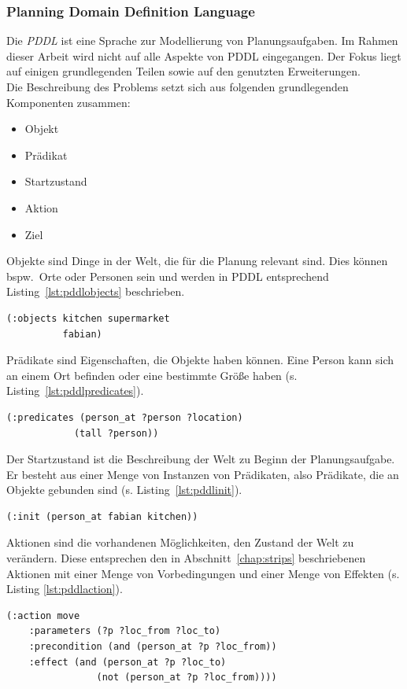 \subsubsection{Planning Domain Definition Language}{\label{sec:pddl}}
Die \emph{\ac{PDDL}} ist eine Sprache zur Modellierung von Planungsaufgaben.
Im Rahmen dieser Arbeit wird nicht auf alle Aspekte von \ac{PDDL} eingegangen.
Der Fokus liegt auf einigen grundlegenden Teilen sowie auf den genutzten Erweiterungen.\\
Die Beschreibung des Problems setzt sich aus folgenden grundlegenden Komponenten zusammen:
\begin{itemize}
    \item Objekt
    \item Prädikat
    \item Startzustand
    \item Aktion
    \item Ziel
\end{itemize}
Objekte sind Dinge in der Welt, die für die Planung relevant sind.
Dies können bspw.\ Orte oder Personen sein und werden in \ac{PDDL} entsprechend Listing~\ref{lst:pddlobjects} beschrieben.
\begin{lstlisting}[caption={Objektbeschreibung in \acs{PDDL}},language=pddl,label={lst:pddlobjects}]
(:objects kitchen supermarket
          fabian)
\end{lstlisting}
Prädikate sind Eigenschaften, die Objekte haben können.
Eine Person kann sich an einem Ort befinden oder eine bestimmte Größe haben (s. Listing~\ref{lst:pddlpredicates}).
\begin{lstlisting}[caption={Prädikatbeschreibung in \acs{PDDL}},language=pddl,label={lst:pddlpredicates}]
(:predicates (person_at ?person ?location)
            (tall ?person))
\end{lstlisting}
Der Startzustand ist die Beschreibung der Welt zu Beginn der Planungsaufgabe.
Er besteht aus einer Menge von Instanzen von Prädikaten, also Prädikate, die an Objekte gebunden sind (s. Listing~\ref{lst:pddlinit}).
\begin{lstlisting}[caption={Startzustand in \acs{PDDL}},language=pddl,label={lst:pddlinit}]
(:init (person_at fabian kitchen))
\end{lstlisting}
Aktionen sind die vorhandenen Möglichkeiten, den Zustand der Welt zu verändern.
Diese entsprechen den in Abschnitt~\ref{chap:strips} beschriebenen Aktionen mit einer Menge von Vorbedingungen und einer Menge von Effekten (s. Listing \ref{lst:pddlaction}).
\begin{lstlisting}[caption={Aktion, um eine Person von einem Ort zum anderen zu bewegen in \acs{PDDL}},language=pddl,label={lst:pddlaction}]
(:action move
    :parameters (?p ?loc_from ?loc_to)
    :precondition (and (person_at ?p ?loc_from))
    :effect (and (person_at ?p ?loc_to)
                (not (person_at ?p ?loc_from))))
\end{lstlisting}
